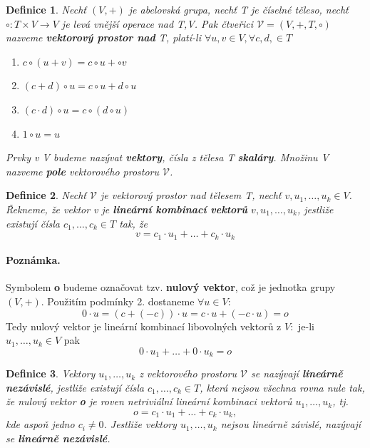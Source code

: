 \documentclass[12pt,a4paper]{article}
\newtheorem{definition}{Definice}
\begin{document}
\begin{definition}
	Nechť $(V, +)$ je abelovská grupa, nechť T je číselné těleso, nechť $\circ : T \times V \rightarrow V$ je levá vnější operace nad T,V. Pak čtveřici $\mathscr{V} = (V, +, T, \circ)$ nazveme \textbf{vektorový prostor nad} T, platí-li $\forall u,v \in V, \forall c,d, \in T$
	\begin{enumerate}
		\item $c \circ (u + v) = c \circ u + \circ v$
		\item $(c + d) \circ u = c \circ u + d \circ u$
		\item $(c \cdot d) \circ u = c \circ (d \circ u)$
		\item $1 \circ u = u$
	\end{enumerate}
	Prvky v V budeme nazývat \textbf{vektory}, čísla z tělesa T \textbf{skaláry}. Množinu V nazveme \textbf{pole} vektorového prostoru $\mathscr{V}$.
\end{definition}

\begin{definition}
	Nechť  $\mathscr{V}$ je vektorový prostor nad tělesem T, nechť $v,u_1,\dots,u_k \in V$. Řekneme, že vektor v je \textbf{lineární kombinací vektorů}  $v,u_1,\dots,u_k$, jestliže existují čísla $c_1, \dots, c_k \in T$ tak, že $$v = c_1 \cdot u_1 + \dots + c_k \cdot u_k$$
\end{definition}
\paragraph{Poznámka.} Symbolem \textbf{o} budeme označovat tzv. \textbf{nulový vektor}, což je jednotka grupy $(V, +)$. Použitím podmínky 2. dostaneme $\forall u \in V:$ $$0 \cdot u = (c + (-c)) \cdot u = c \cdot u + (-c \cdot u) = o$$
Tedy nulový vektor je lineární kombinací libovolných vektorů z $V: $ je-li $u_1,\dots,u_k \in V$ pak $$0 \cdot u_1 + \dots + 0 \cdot u_k = o$$


\begin{definition}
	Vektory $u_1, \dots, u_k$ z vektorového prostoru $\mathscr{V}$ se nazývají \textbf{lineárně nezávislé}, jestliže existují čísla $c_1, \dots, c_k \in T$, která nejsou všechna rovna nule tak, že nulový vektor \textbf{o} je roven netriviální lineární kombinaci vektorů $u_1, \dots, u_k$, tj. $$o = c_1 \cdot u_1 + \dots + c_k \cdot u_k,$$
	kde aspoň jedno $c_i \not= 0$. Jestliže vektory $u_1, \dots, u_k$ nejsou lineárně závislé, nazývají se \textbf{lineárně nezávislé}.
\end{definition}
\end{document}
